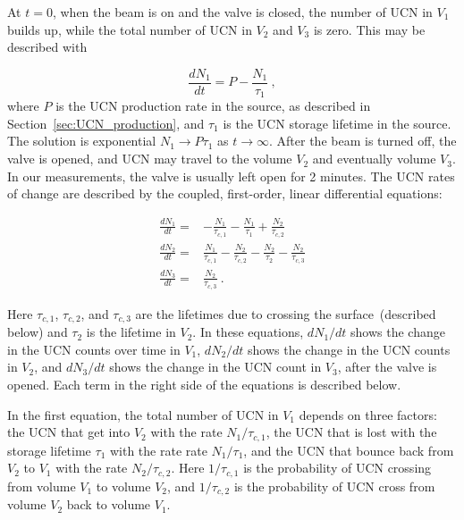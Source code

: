 At $t = 0$, when the beam is on and the valve is closed, the number of UCN in
$V_1$ builds up, while the total number of UCN in $V_2$ and $V_3$ is
zero. This may be described with 

\begin{equation}
  \label{eqn:dndt}
\frac{dN_1}{dt} = P - \frac{N_1}{\tau_1}~,
\end{equation}
where $P$ is the UCN production rate in the source, as described in
Section~\ref{sec:UCN_production}, and $\tau_1$ is the UCN storage
lifetime in the source. The solution is exponential
$N_1 \rightarrow P \tau_1$ as $t \rightarrow \infty$. After the beam
is turned off, the valve is opened, and UCN may travel to the volume
$V_2$ and eventually volume $V_3$. In our measurements, the valve is
usually left open for 2 minutes. The UCN rates of change are described
by the coupled, first-order, linear differential equations:

\begin{equation}
  \label{eqn:alldndt}
  \begin{aligned}
    \frac{dN_1}{dt} =&- \frac{N_1}{\tau_{c,1}} - \frac{N_1}{\tau_1} + \frac{N_2}{\tau_{c,2}}  \\
    \frac{dN_2}{dt} =& \frac{N_1}{\tau_{c,1}} - \frac{N_2}{\tau_{c,2}} - \frac{N_2}{\tau_2} - \frac{N_2}{\tau_{c,3}} \\
    \frac{dN_3}{dt} =& \frac{N_2}{\tau_{c,3}}~.
  \end{aligned}
\end{equation}

Here $\tau_{c,1}$, $\tau_{c,2}$, and $\tau_{c,3}$ are the lifetimes
due to crossing the surface~(described below) and $\tau_2$ is the
lifetime in $V_2$. In these equations, $dN_1/dt$ shows the change in
the UCN counts over time in $V_1$, $dN_2/dt$ shows the change in the
UCN counts in $V_2$, and $dN_3/dt$ shows the change in the UCN count
in $V_3$, after the valve is opened. Each term in the right side of
the equations is described below.

In the first equation, the total number of UCN in $V_1$ depends on
three factors: the UCN that get into $V_2$ with the rate
$N_1/\tau_{c,1}$, the UCN that is lost with the storage lifetime
$\tau_1$ with the rate rate $N_1/\tau_{1}$, and the UCN that bounce
back from $V_2$ to $V_1$ with the rate $N_2/\tau_{c,2}$. Here
$1/\tau_{c,1}$ is the probability of UCN crossing from volume $V_1$ to
volume $V_2$, and $1/\tau_{c,2}$ is the probability of UCN cross from
volume $V_2$ back to volume $V_1$.


